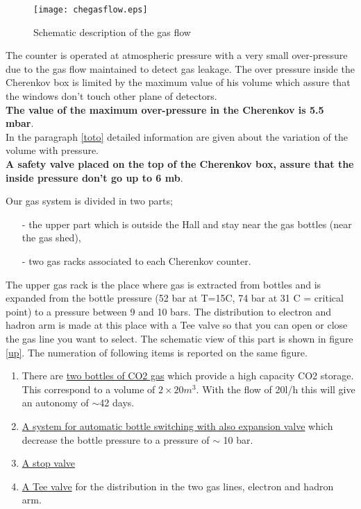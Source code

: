 \documentclass[12pt]{article}
\begin{document}
\begin{figure}
\begin{center}
\texttt{[image: chegasflow.eps]}
{\linespread{1.}
\caption[Cherenkov gas flow]{Schematic description of the gas flow}
\label{down}}
\end{center}
\end{figure}

The counter is operated at atmospheric pressure with a very small
over-pressure due to the gas flow maintained to detect gas leakage. 
The over pressure inside the Cherenkov box is limited by the maximum value
of his volume which assure that the windows don't touch other plane
of detectors.\\ 
{\bf The value of the maximum over-pressure in the Cherenkov is 5.5 mbar}.\\
In the paragraph \ref{toto} detailed information are given about the
 variation of the volume with pressure.\\
{\bf A safety valve placed on the top of the
Cherenkov box, assure that the inside pressure don't go up to 6 mb}.

\label{upi}

Our gas system is divided in two parts; 
\begin{itemize}
\item[-] the upper part which is outside the Hall and stay near the gas 
bottles (near the gas shed),
\item[-] two gas racks associated to each Cherenkov counter.
\end{itemize}
The upper gas rack is the place where gas is extracted from bottles and is
 expanded from the bottle pressure (52 bar at T=15C, 74 bar at 31 C 
= critical point) to a pressure between 9 and 10 bars. The distribution to 
electron and hadron arm is made at this place with a Tee valve so that you
can open or close the gas line you want to select. The schematic view of this
part is shown  in figure \ref{up}. The numeration of following items is 
reported on the same figure.
\begin{enumerate}
\item There are \underline{two bottles of CO2 gas} 
which provide a high capacity CO2 storage. This correspond to a volume 
of $2\times 20m^3$. With the flow of 20l/h  this will give an autonomy 
of $\sim$42 days.
\item \underline{A system for automatic bottle switching with also expansion 
valve} which decrease the bottle pressure to a pressure of $\sim$ 10 bar.
\item \underline{A stop valve}
\item \underline{A Tee valve} for the distribution in the two gas lines, 
electron and hadron arm.
\end{enumerate}
\end{document}
